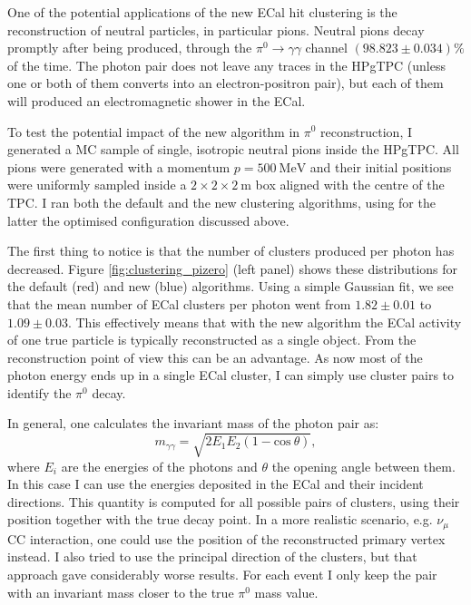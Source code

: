 One of the potential applications of the new ECal hit clustering is the reconstruction of neutral particles, in particular pions. Neutral pions decay promptly after being produced, through the $\pi^{0} \rightarrow \gamma\gamma$ channel $(98.823 \pm 0.034)\%$ of the time. The photon pair does not leave any traces in the HPgTPC (unless one or both of them converts into an electron-positron pair), but each of them will produced an electromagnetic shower in the ECal.

To test the potential impact of the new algorithm in $\pi^{0}$ reconstruction, I generated a MC sample of single, isotropic neutral pions inside the HPgTPC. All pions were generated with a momentum $p = 500 \ \mathrm{MeV}$ and their initial positions were uniformly sampled inside a $2 \times 2 \times 2 \ \mathrm{m}$ box aligned with the centre of the TPC. I ran both the default and the new clustering algorithms, using for the latter the optimised configuration discussed above.

The first thing to notice is that the number of clusters produced per photon has decreased. Figure \ref{fig:clustering_pizero} (left panel) shows these distributions for the default (red) and new (blue) algorithms. Using a simple Gaussian fit, we see that the mean number of ECal clusters per photon went from $1.82 \pm 0.01$ to $1.09 \pm 0.03$. This effectively means that with the new algorithm the ECal activity of one true particle is typically reconstructed as a single object. From the reconstruction point of view this can be an advantage. As now most of the photon energy ends up in a single ECal cluster, I can simply use cluster pairs to identify the $\pi^{0}$ decay.

In general, one calculates the invariant mass of the photon pair as:
\begin{equation}
	m_{\gamma\gamma} = \sqrt{2E_{1}E_{2}(1-\mathrm{cos} \ \theta)},
\end{equation}
where $E_{i}$ are the energies of the photons and $\theta$ the opening angle between them. In this case I can use the energies deposited in the ECal and their incident directions. This quantity is computed for all possible pairs of clusters, using their position together with the true decay point. In a more realistic scenario, e.g. $\nu_{\mu}$ CC interaction, one could use the position of the reconstructed primary vertex instead. I also tried to use the principal direction of the clusters, but that approach gave considerably worse results. For each event I only keep the pair with an invariant mass closer to the true $\pi^{0}$ mass value.

